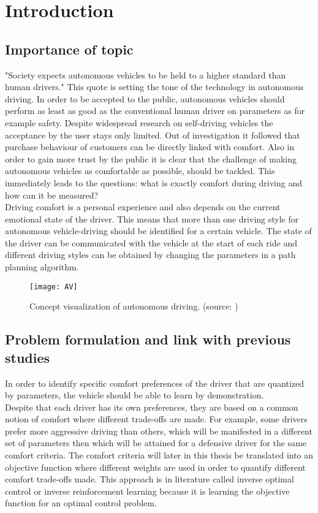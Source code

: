 \chapter{Introduction}
\label{cha:intro}
\section{Importance of topic}
"Society expects autonomous vehicles to be held to a higher standard than human drivers." \cite{Prof.Amnon} This quote is setting the tone of the technology in autonomous driving. In order to be accepted to the public, autonomous vehicles should perform as least as good as the conventional human driver on parameters as for example safety. Despite widespread research on self-driving vehicles the acceptance by the user stays only limited.\cite{Bae2019} Out of investigation it followed that purchase behaviour of customers can be directly linked with comfort. Also in order to gain more trust by the public it is clear that the challenge of making autonomous vehicles as comfortable as possible, should be tackled. This immediately leads to the questions: what is exactly comfort during driving and how can it be measured?\\
Driving comfort is a personal experience and also depends on the current emotional state of the driver. This means that more than one driving style for autonomous vehicle-driving should be identified for a certain vehicle. \cite{Eindhoven2019} The state of the driver can be communicated with the vehicle at the start of each ride and different driving styles can be obtained by changing the parameters in a path planning algorithm. 

\begin{figure}[h!]
	\centering
	\texttt{[image: AV]}
	\caption{Concept visualization of autonomous driving. (source: \cite{AV})}
	\label{fig:AV}
\end{figure} 
\newpage

\section{Problem formulation and link with previous studies}
In order to identify specific comfort preferences of the driver that are quantized by parameters, the vehicle should be able to learn by demonstration. \cite{Kuderer2015a}\\
Despite that each driver has its own preferences, they are based on a common notion of comfort where different trade-offs are made. For example, some drivers prefer more aggressive driving than others, which will be manifested in a different set of parameters then which will be attained for a defensive driver for the same comfort criteria. The comfort criteria will later in this thesis be translated into an objective function where different weights are used in order to quantify different comfort trade-offs made. This approach is in literature called inverse optimal control or inverse reinforcement learning because it is learning the objective function for an optimal control problem.\\

